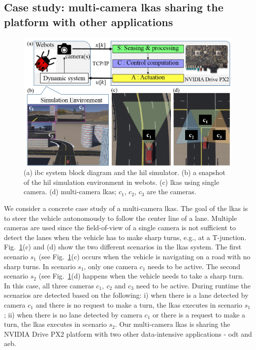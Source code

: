 \subsection{Case study: multi-camera \gls{lkas} sharing the platform with other applications}
\begin{figure}[t]
\centerline{
    \includegraphics[scale=0.5]{images/HiL.png}
    }
    \caption{(a) \Gls{ibc} system block diagram and the \gls{hil} simulator. (b) a snapshot of the \gls{hil} simulation environment in webots. (c) \gls{lkas} using single camera. (d) multi-camera \gls{lkas}; $c_1$, $c_2$, $c_3$ are the cameras.}
    \label{fig:ch5_IBC_setting}
\end{figure}
We consider a concrete case study of a multi-camera \gls{lkas}. The goal of the \gls{lkas} is to steer the vehicle autonomously to follow the center line of a lane. Multiple cameras are used since the field-of-view of a single camera is not sufficient to detect the lanes when the vehicle has to make sharp turns, e.g., at a T-junction. Fig.~\ref{fig:ch5_IBC_setting}(c) and (d) show the two different scenarios in the \gls{lkas} system. The first scenario $s_1$ (see Fig.~\ref{fig:ch5_IBC_setting}(c) occurs when the vehicle is navigating on a road with no sharp turns. In scenario $s_1$, only one camera $c_1$ needs to be active. The second scenario $s_2$ (see Fig.~\ref{fig:ch5_IBC_setting}(d) happens when the vehicle needs to take a sharp turn. In this case, all three cameras $c_1,\ c_2$ and $c_3$ need to be active. 
During runtime the scenarios are detected based on the following: i) when there is a lane detected by camera $c_1$ and there is no request to make a turn, the \gls{lkas} executes in scenario $s_1$; ii) when there is no lane detected by camera $c_1$ or there is a request to make a turn, the \gls{lkas} executes in scenario $s_2$. Our multi-camera \gls{lkas} is sharing the NVIDIA Drive PX2 platform with two other data-intensive applications - \gls{odt} and \gls{aeb}.


